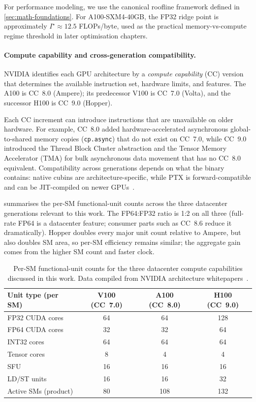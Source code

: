 For performance modeling, we use the canonical roofline framework
defined in \cref{sec:math-foundations}. For A100-SXM4-40GB, the FP32 ridge
point is approximately $I^\star\approx 12.5$ FLOPs/byte, used as the practical
memory-vs-compute regime threshold in later optimisation chapters.

\paragraph{Compute capability and cross-generation compatibility.}
NVIDIA identifies each GPU architecture by a \emph{compute capability} (CC)
version that determines the available instruction set, hardware limits, and
features. The A100 is CC~8.0 (Ampere); its predecessor V100 is CC~7.0
(Volta), and the successor H100 is CC~9.0 (Hopper).

Each CC increment can introduce instructions that are unavailable on older
hardware. For example, CC~8.0 added hardware-accelerated asynchronous
global-to-shared memory copies (\texttt{cp.async}) that do not exist on
CC~7.0, while CC~9.0 introduced the Thread Block Cluster abstraction and
the Tensor Memory Accelerator (TMA) for bulk asynchronous data movement
that has no CC~8.0 equivalent. Compatibility across generations depends on
what the binary contains: native cubins are architecture-specific, while PTX
is forward-compatible and can be JIT-compiled on newer GPUs~\cite{nvidia-ada-compat-guide}.

 summarises the per-SM functional-unit
counts across the three datacenter generations relevant to this work.
The FP64:FP32 ratio is 1:2 on all three (full-rate FP64 is a datacenter
feature; consumer parts such as CC~8.6 reduce it dramatically). Hopper
doubles every major unit count relative to Ampere, but also doubles SM
area, so per-SM efficiency remains similar; the aggregate gain comes from
the higher SM count and faster clock.

\begin{table}[H]
\centering
\caption{Per-SM functional-unit counts for the three datacenter compute
  capabilities discussed in this work. Data compiled from NVIDIA
  architecture whitepapers~\cite{nvidia2017volta,nvidia2020a100,nvidia2022h100}.}
\label{tab:cc-functional-units}
\begin{tabular}{l c c c}
\toprule
Unit type (per SM) & V100 (CC~7.0) & A100 (CC~8.0) & H100 (CC~9.0) \\
\midrule
FP32 CUDA cores      & 64  & 64  & 128 \\
FP64 CUDA cores      & 32  & 32  & 64  \\
INT32 cores           & 64  & 64  & 64  \\
Tensor cores          & 8   & 4   & 4   \\
SFU                   & 16  & 16  & 16  \\
LD/ST units           & 16  & 16  & 32  \\
Active SMs (product)  & 80  & 108 & 132 \\
\bottomrule
\end{tabular}
\end{table}

